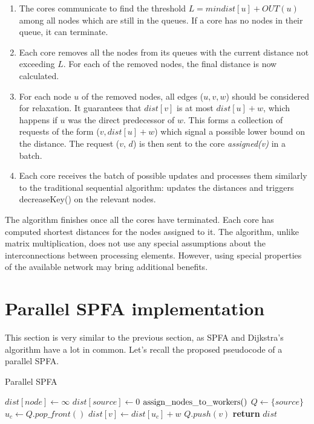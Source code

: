 \documentclass[12pt,a4paper,twoside,openright]{report}
\begin{document}
\begin{enumerate}
    \item The cores communicate to find the threshold $L = min{dist[u] + OUT(u)}$ among all nodes which are still in the queues. If a core has no nodes in their queue, it can terminate.
    \item Each core removes all the nodes from its queues with the current distance not exceeding $L$. For each of the removed nodes, the final distance is now calculated.
    \item For each node $u$ of the removed nodes, all edges ($u, v, w$) should be considered for relaxation. It guarantees that $dist[v]$ is at most $dist[u] + w$, which happens if $u$ was the direct predecessor of $w$. This forms a collection of requests of the form ($v, dist[u]+w$) which signal a possible lower bound on the distance. The request ($v$, $d$) is then sent to the core \textit{assigned(v)} in a batch.
    \item Each core receives the batch of possible updates and processes them similarly to the traditional sequential algorithm: updates the distances and triggers decreaseKey() on the relevant nodes.
\end{enumerate}

The algorithm finishes once all the cores have terminated. Each core has computed shortest distances for the nodes assigned to it. The algorithm, unlike matrix multiplication, does not use any special assumptions about the interconnections between processing elements. However, using special properties of the available network may bring additional benefits.

\section{Parallel SPFA implementation}
This section is very similar to the previous section, as SPFA and Dijkstra's algorithm have a lot in common. Let's recall the proposed pseudocode of a parallel SPFA.

\begin{algorithm}
\caption{Parallel SPFA}\label{pspfa2}
\begin{algorithmic}[1]
    \State $dist[node] \gets \infty$
\EndFor
\State $dist[source] \gets 0$
\State $\rm{assign\_nodes\_to\_workers()}$
\State $Q \gets \{source\}$ 
        \State $u_c \gets Q.pop\_front()$
            \State $dist[v] \gets dist[u_c] + w$
                \State $Q.push(v)$
                \EndIf
        \EndIf
        \EndFor
      \EndFor
    \EndWhile
\State \textbf{return} $dist$
\EndProcedure
\end{algorithmic}
\end{algorithm}
\end{document}
